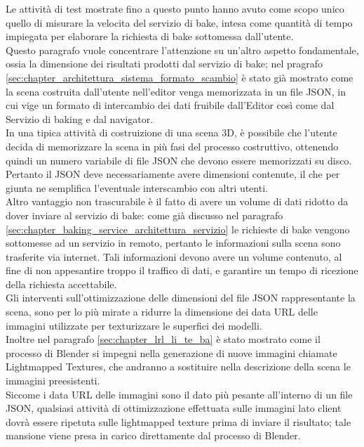 Le attività di test mostrate fino a questo punto hanno avuto come scopo unico quello di misurare la velocita del servizio di bake, intesa come quantità di tempo impiegata per elaborare la richiesta di bake sottomessa dall’utente. 
\\
Questo paragrafo vuole concentrare l’attenzione su un’altro aspetto fondamentale, ossia la dimensione dei risultati prodotti dal servizio di bake; nel pragrafo \ref{sec:chapter_architettura_sistema_formato_scambio} è stato già mostrato come la scena costruita dall’utente nell’editor venga memorizzata in un file JSON, in cui vige un formato di intercambio dei dati fruibile dall’Editor così come dal Servizio di baking e dal navigator.
\\
In una tipica attività di costruizione di una scena 3D, è possibile che l’utente decida di memorizzare la scena in più fasi del processo costruttivo, ottenendo quindi un numero variabile di file JSON che devono essere memorizzati su disco. Pertanto il JSON deve necessariamente avere dimensioni contenute, il che per giunta ne semplifica l’eventuale interscambio con altri utenti. 
\\
Altro vantaggio non trascurabile è il fatto di avere un volume di dati ridotto da dover inviare al servizio di bake: come già discusso nel paragrafo \ref{sec:chapter_baking_service_architettura_servizio} le richieste di bake vengono sottomesse ad un servizio in remoto, pertanto le informazioni sulla scena sono trasferite via internet. Tali informazioni devono avere un volume contenuto, al fine di non appesantire troppo il traffico di dati, e garantire un tempo di ricezione della richiesta accettabile. 
\\
Gli interventi sull’ottimizzazione delle dimensioni del file JSON rappresentante la scena, sono per lo più mirate a ridurre la dimensione dei data URL delle immagini utilizzate per texturizzare le superfici dei modelli.
\\
Inoltre nel paragrafo \ref{sec:chapter_lrl_li_te_ba} è stato mostrato come il processo di Blender si impegni nella generazione di nuove immagini chiamate Lightmapped Textures, che andranno a sostituire nella descrizione della scena le immagini preesistenti.
\\
Siccome i data URL delle immagini sono il dato più pesante all’interno di un file JSON, qualsiasi attività di ottimizzazione effettuata sulle immagini lato client dovrà essere ripetuta sulle lightmapped texture prima di inviare il risultato; tale mansione viene presa in carico direttamente dal processo di Blender.
